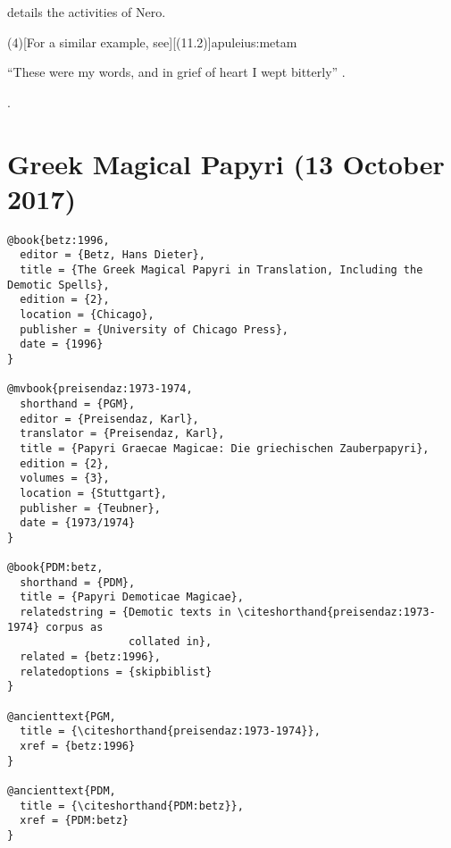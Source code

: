 \documentclass[a4paper]{article}
\renewcommand\footnote[1]{##1}%
\begin{document}
\begin{verbcite}
  \cite[(15)]{tacitus:ann} details the activities of Nero.
\end{verbcite}
\examplecite(4)[For a similar example, see][(11.2)]{apuleius:metam}
\begin{verbcite}
  “These were my words, and in grief of heart I wept bitterly”
  .
\end{verbcite}
\cite{apuleius:golden}.
\begin{verbcite}
  \nocite{aristotle:metaphysics:2, augustine:cityofgod:1,
    aristotle:metaphysics, augustine:cityofgod, augustine:selectletters,
    aristotle:poetics, longinus:sublime, demetrius:style}
\end{verbcite}
\nocite{aristotle:poetics:book:short}
\exampleancientsources
\examplesecondarysources
\examplebibliography
{}

\section{Greek Magical Papyri (13 October 2017)}

\begin{verbatim}
@book{betz:1996,
  editor = {Betz, Hans Dieter},
  title = {The Greek Magical Papyri in Translation, Including the Demotic Spells},
  edition = {2},
  location = {Chicago},
  publisher = {University of Chicago Press},
  date = {1996}
}

@mvbook{preisendaz:1973-1974,
  shorthand = {PGM},
  editor = {Preisendaz, Karl},
  translator = {Preisendaz, Karl},
  title = {Papyri Graecae Magicae: Die griechischen Zauberpapyri},
  edition = {2},
  volumes = {3},
  location = {Stuttgart},
  publisher = {Teubner},
  date = {1973/1974}
}

@book{PDM:betz,
  shorthand = {PDM},
  title = {Papyri Demoticae Magicae},
  relatedstring = {Demotic texts in \citeshorthand{preisendaz:1973-1974} corpus as
                   collated in},
  related = {betz:1996},
  relatedoptions = {skipbiblist}
}

@ancienttext{PGM,
  title = {\citeshorthand{preisendaz:1973-1974}},
  xref = {betz:1996}
}

@ancienttext{PDM,
  title = {\citeshorthand{PDM:betz}},
  xref = {PDM:betz}
}
\end{verbatim}
\end{document}
